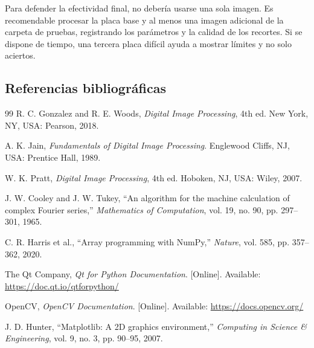 \documentclass[11pt]{article}
\begin{document}
Para defender la efectividad final, no debería usarse una sola imagen. Es recomendable procesar la placa base y al menos una imagen adicional de la carpeta de pruebas, registrando los parámetros y la calidad de los recortes. Si se dispone de tiempo, una tercera placa difícil ayuda a mostrar límites y no solo aciertos.

\subsection{Referencias bibliográficas}
{
    \renewcommand{\refname}{}
    \vspace{-1.5em}

    \begin{thebibliography}{99}
        R. C. Gonzalez and R. E. Woods, \textit{Digital Image Processing}, 4th ed. New York, NY, USA: Pearson, 2018.

        A. K. Jain, \textit{Fundamentals of Digital Image Processing}. Englewood Cliffs, NJ, USA: Prentice Hall, 1989.

        W. K. Pratt, \textit{Digital Image Processing}, 4th ed. Hoboken, NJ, USA: Wiley, 2007.

        J. W. Cooley and J. W. Tukey, ``An algorithm for the machine calculation of complex Fourier series,'' \textit{Mathematics of Computation}, vol. 19, no. 90, pp. 297--301, 1965.

        C. R. Harris et al., ``Array programming with NumPy,'' \textit{Nature}, vol. 585, pp. 357--362, 2020.

        The Qt Company, \textit{Qt for Python Documentation}. [Online]. Available: \url{https://doc.qt.io/qtforpython/}

        OpenCV, \textit{OpenCV Documentation}. [Online]. Available: \url{https://docs.opencv.org/}

        J. D. Hunter, ``Matplotlib: A 2D graphics environment,'' \textit{Computing in Science \& Engineering}, vol. 9, no. 3, pp. 90--95, 2007.
    \end{thebibliography}
}
\end{document}
